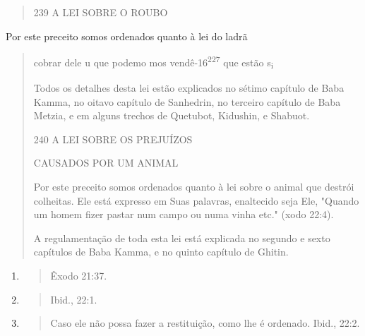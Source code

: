 \begin{quote}
239 A LEI SOBRE O ROUBO
\end{quote}

Por este preceito somos ordenados quanto à lei do ladrã

\begin{quote}
cobrar dele u que podemo mos vendê-16\textsuperscript{227} que estão
s\textsubscript{i}

Todos os detalhes desta lei estão explicados no sétimo capítulo de Baba
Kamma, no oitavo capítulo de Sanhedrin, no terceiro capítulo de Baba
Metzia, e em alguns trechos de Quetubot, Kidushin, e Shabuot.

240 A LEI SOBRE OS PREJUÍZOS

CAUSADOS POR UM ANIMAL

Por este preceito somos ordenados quanto à lei sobre o animal que
destrói colheitas. Ele está expresso em Suas palavras, enaltecido seja
Ele, "Quan­do um homem fizer pastar num campo ou numa vinha etc." (xodo
22:4).

A regulamentação de toda esta lei está explicada no segundo e sexto
capítulos de Baba Kamma, e no quinto capítulo de Ghitin.
\end{quote}

\begin{enumerate}
\def\labelenumi{\arabic{enumi}.}
\setcounter{enumi}{224}
\item
  \begin{quote}
  Êxodo 21:37.
  \end{quote}
\item
  \begin{quote}
  Ibid., 22:1.
  \end{quote}
\item
  \begin{quote}
  Caso ele não possa fazer a restituição, como lhe é ordenado. Ibid.,
  22:2.
  \end{quote}
\end{enumerate}

